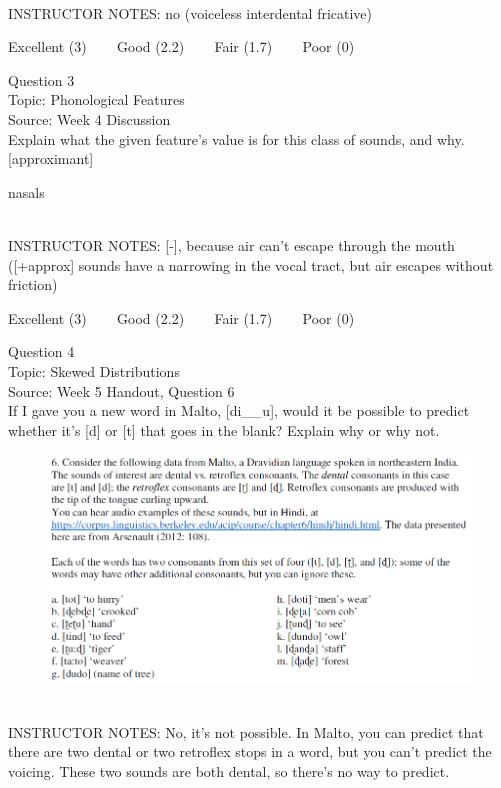 \documentclass[12pt]{article}
\begin{document}
~\\
INSTRUCTOR NOTES: no (voiceless interdental fricative)


\vfill
Excellent (3) ~~~ Good (2.2) ~~~ Fair (1.7) ~~~ Poor (0)
\newpage

{\large Question 3}\\

Topic: Phonological Features\\
Source: Week 4 Discussion\\

Explain what the given feature’s value is for this class of sounds, and why.\\

{[approximant]}

nasals


~\\
INSTRUCTOR NOTES: [-], because air can't escape through the mouth ([+approx] sounds have a narrowing in the vocal tract, but air escapes without friction)


\vfill
Excellent (3) ~~~ Good (2.2) ~~~ Fair (1.7) ~~~ Poor (0)
\newpage

{\large Question 4}\\

Topic: Skewed Distributions\\
Source: Week 5 Handout, Question 6\\

If I gave you a new word in Malto, [di\_\_u], would it be possible to predict whether it's [d] or [t] that goes in the blank? Explain why or why not.\\

\begin{figure}[H]
\includegraphics{../images/malto.png}
\end{figure}

~\\
INSTRUCTOR NOTES: No, it's not possible. In Malto, you can predict that there are two dental or two retroflex stops in a word, but you can't predict the voicing. These two sounds are both dental, so there's no way to predict.
\end{document}

